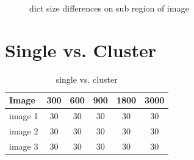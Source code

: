 \begin{figure}[h]
\centering
{}
\hspace{5mm}
\hspace{5mm}
\caption{dict size differences on sub region of image}
\label{fig:dict size}
\end{figure}

\section{Single vs. Cluster}
\begin{table}[H]
\caption{single vs. cluster}
\centering
\begin{tabular}{l c c c c c}
\hline\hline
Image & 300 & 600 & 900 & 1800 & 3000 \\
\hline
image 1 & 30 & 30 & 30 & 30 & 30 \\
image 2 & 30 & 30 & 30 & 30 & 30 \\
image 3 & 30 & 30 & 30 & 30 & 30 \\
\hline
\end{tabular}
\end{table}

